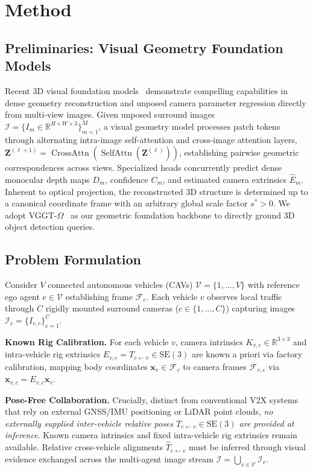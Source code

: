 \section{Method}
\subsection{Preliminaries: Visual Geometry Foundation Models}
\label{sec:preliminaries}
Recent 3D visual foundation models~\cite{dust3r,vggt,omega} demonstrate compelling capabilities in dense geometry reconstruction and unposed camera parameter regression directly from multi-view images. Given unposed surround images $\mathcal{I} = \{I_m \in \mathbb{R}^{H \times W \times 3}\}_{m=1}^M$, a visual geometry model processes patch tokens through alternating intra-image self-attention and cross-image attention layers, $\mathbf{Z}^{(\ell+1)} = \operatorname{CrossAttn}(\operatorname{SelfAttn}(\mathbf{Z}^{(\ell)}))$, establishing pairwise geometric correspondences across views. Specialized heads concurrently predict dense monocular depth maps $D_m$, confidence $C_m$, and estimated camera extrinsics $\hat{E}_m$. Inherent to optical projection, the reconstructed 3D structure is determined up to a canonical coordinate frame with an arbitrary global scale factor $s^* > 0$. We adopt VGGT-$\Omega$~\cite{omega} as our geometric foundation backbone to directly ground 3D object detection queries.

\subsection{Problem Formulation}
\label{sec:problem_formulation}
Consider $V$ connected autonomous vehicles (CAVs) $\mathcal{V} = \{1, \dots, V\}$ with reference ego agent $e \in \mathcal{V}$ establishing frame $\mathcal{F}_e$. Each vehicle $v$ observes local traffic through $C$ rigidly mounted surround cameras ($c \in \{1, \dots, C\}$) capturing images $\mathcal{I}_v = \{I_{v,c}\}_{c=1}^C$.

\textbf{Known Rig Calibration.} For each vehicle $v$, camera intrinsics $K_{v,c} \in \mathbb{R}^{3 \times 3}$ and intra-vehicle rig extrinsics $E_{v,c} = T_{c \leftarrow v} \in \mathrm{SE}(3)$ are known a priori via factory calibration, mapping body coordinates $\mathbf{x}_v \in \mathcal{F}_v$ to camera frames $\mathcal{F}_{v,c}$ via $\mathbf{x}_{v,c} = E_{v,c} \mathbf{x}_v$.

\textbf{Pose-Free Collaboration.} Crucially, distinct from conventional V2X systems that rely on external GNSS/IMU positioning or LiDAR point clouds, \emph{no externally supplied inter-vehicle relative poses $T_{e \leftarrow v} \in \mathrm{SE}(3)$ are provided at inference}. Known camera intrinsics and fixed intra-vehicle rig extrinsics remain available. Relative cross-vehicle alignments $\hat{T}_{e \leftarrow v}$ must be inferred through visual evidence exchanged across the multi-agent image stream $\mathcal{I} = \bigcup_{v \in \mathcal{V}} \mathcal{I}_v$.

